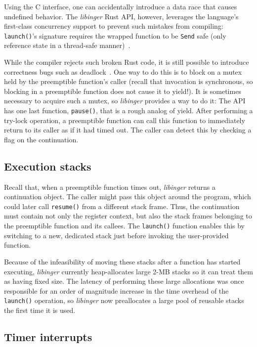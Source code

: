 Using the C interface, one can accidentally introduce a data race that causes
undefined behavior.  The \textit{libinger} Rust API, however, leverages the
language's first-class concurrency support to prevent such mistakes from compiling:\@
\texttt{launch()}'s signature requires the wrapped function to be \texttt{Send} safe
(only reference state in a thread-safe manner)~\cite{www-rustlang-conc}.

While the compiler rejects such broken Rust code, it is still possible to introduce
correctness bugs such as deadlock~\cite{www-rustlang-nu}.  One way to do this is to
block on a mutex held by
the preemptible function's caller (recall that invocation is synchronous, so blocking
in a preemptible function does not cause it to yield!).  It is sometimes necessary to
acquire such a mutex, so \textit{libinger} provides a way to do it:  The API has one
last function, \texttt{pause()}, that is a rough analog of yield.  After performing a
try-lock operation, a preemptible function can call this function to immediately
return to its caller as if it had timed out.  The caller can detect this by checking
a flag on the continuation.


\subsection{Execution stacks}

Recall that, when a preemptible function times out, \textit{libinger} returns a
continuation object.  The caller might pass this object around the program, which
could later call \texttt{resume()} from a different stack frame.  Thus, the
continuation must contain not only the register context, but also the stack
frames belonging to the preemptible function and its callees.  The \texttt{launch()}
function enables this by switching to a new, dedicated stack just before invoking the
user-provided function.

Because of the infeasibility of moving these stacks after a function has started
executing, \textit{libinger} currently heap-allocates large 2-MB stacks so it can
treat them as having fixed size.  The latency of performing these large allocations
was once responsible for an order of magnitude increase in the time overhead of the
\texttt{launch()} operation, so \textit{libinger} now preallocates a large pool of
reusable stacks the first time it is used.


\subsection{Timer interrupts}

